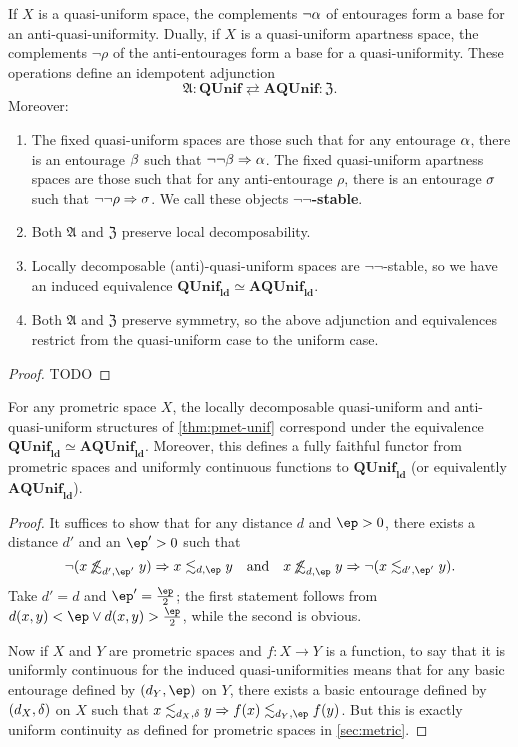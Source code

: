 \documentclass{article}
\def\oapt{\mathrel{\!\not\,\not\lesssim}}
\def\leapx{\lesssim}
\def\ent#1{\leapx_{#1}}
\def\aent#1{\oapt_{#1}}
\let\implies\Rightarrow
\def\hfep{\frac{\ep}{2}}
\def\anti{\mathfrak{A}}
\def\neigh{\mathfrak{Z}}
\def\nn{\ensuremath{\neg\neg}}
\def\QUnif{\mathbf{QUnif}}
\def\ldQUnif{\mathbf{QUnif}_{\mathbf{ld}}}
\def\AQUnif{\mathbf{AQUnif}}
\def\ldAQUnif{\mathbf{AQUnif}_{\mathbf{ld}}}
\begin{document}
\begin{thm}
  If $X$ is a quasi-uniform space, the complements $\neg\alpha$ of entourages form a base for an anti-quasi-uniformity.
  Dually, if $X$ is a quasi-uniform apartness space, the complements $\neg\rho$ of the anti-entourages form a base for a quasi-uniformity.
  These operations define an idempotent adjunction
  \[ \anti : \QUnif \rightleftarrows \AQUnif : \neigh. \]
  Moreover:
  \begin{enumerate}
  \item The fixed quasi-uniform spaces are those such that for any entourage $\alpha$, there is an entourage $\beta$ such that $\neg\neg\be\implies \al$.
    The fixed quasi-uniform apartness spaces are those such that for any anti-entourage $\rho$, there is an entourage $\sigma$ such that $\neg\neg\rho \implies \si$.
    We call these objects \textbf{\nn-stable}.
  \item Both $\anti$ and $\neigh$ preserve local decomposability.
  \item Locally decomposable (anti)-quasi-uniform spaces are \nn-stable, so we have an induced equivalence $\ldQUnif \simeq \ldAQUnif$.
  \item Both $\anti$ and $\neigh$ preserve symmetry, so the above adjunction and equivalences restrict from the quasi-uniform case to the uniform case.
  \end{enumerate}
\end{thm}
\begin{proof}
  TODO
\end{proof}

\begin{thm}
  For any prometric space $X$, the locally decomposable quasi-uniform and anti-quasi-uniform structures of \cref{thm:pmet-unif} correspond under the equivalence $\ldQUnif \simeq \ldAQUnif$.
  Moreover, this defines a fully faithful functor from prometric spaces and uniformly continuous functions to $\ldQUnif$ (or equivalently $\ldAQUnif$).
\end{thm}
\begin{proof}
  It suffices to show that for any distance $d$ and $\ep>0$, there exists a distance $d'$ and an $\ep'>0$ such that
  \[\neg(x\aent{d',\ep'} y) \implies x\ent{d,\ep} y \quad\text{and}\quad x\aent{d,\ep} y \implies \neg(x\ent{d',\ep'} y) .\]
  Take $d'=d$ and $\ep'= \hfep$; the first statement follows from $d(x,y)<\ep \lor d(x,y)>\hfep$, while the second is obvious.

  Now if $X$ and $Y$ are prometric spaces and $f:X\to Y$ is a function, to say that it is uniformly continuous for the induced quasi-uniformities means that for any basic entourage defined by $(d_Y,\ep)$ on $Y$, there exists a basic entourage defined by $(d_X,\delta)$ on $X$ such that $x\ent{d_X,\de} y \implies f(x) \ent{d_Y,\ep} f(y)$.
  But this is exactly uniform continuity as defined for prometric spaces in \cref{sec:metric}.
\end{proof}
\end{document}
